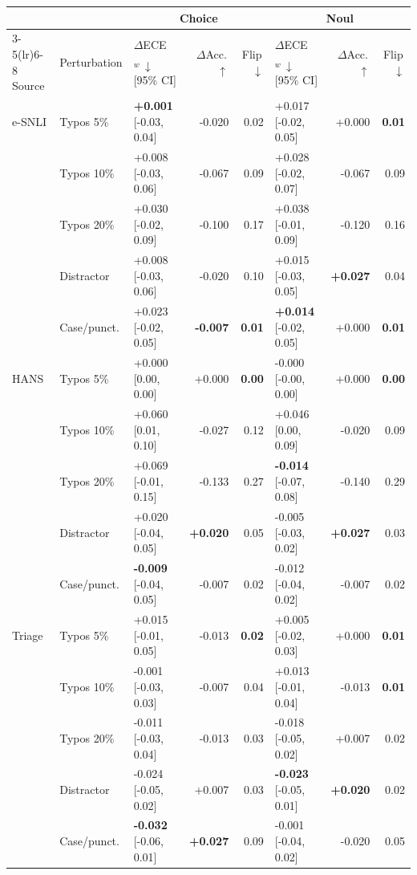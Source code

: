 \begin{tabular}{lllrrlrr}
\toprule
 & & \multicolumn{3}{c}{Choice} & \multicolumn{3}{c}{Noul} \\
\cmidrule(lr){3-5}\cmidrule(lr){6-8}
Source & Perturbation & $\Delta$ECE$_{w}\,\downarrow$ [95\% CI] & $\Delta$Acc.\,$\uparrow$ & Flip\,$\downarrow$ & $\Delta$ECE$_{w}\,\downarrow$ [95\% CI] & $\Delta$Acc.\,$\uparrow$ & Flip\,$\downarrow$ \\
\midrule
e-SNLI & Typos 5\% & \textbf{+0.001} [-0.03, 0.04] & -0.020 & 0.02 & +0.017 [-0.02, 0.05] & +0.000 & \textbf{0.01} \\
 & Typos 10\% & +0.008 [-0.03, 0.06] & -0.067 & 0.09 & +0.028 [-0.02, 0.07] & -0.067 & 0.09 \\
 & Typos 20\% & +0.030 [-0.02, 0.09] & -0.100 & 0.17 & +0.038 [-0.01, 0.09] & -0.120 & 0.16 \\
 & Distractor & +0.008 [-0.03, 0.06] & -0.020 & 0.10 & +0.015 [-0.03, 0.05] & \textbf{+0.027} & 0.04 \\
 & Case/punct. & +0.023 [-0.02, 0.05] & \textbf{-0.007} & \textbf{0.01} & \textbf{+0.014} [-0.02, 0.05] & +0.000 & \textbf{0.01} \\
\midrule
HANS & Typos 5\% & +0.000 [0.00, 0.00] & +0.000 & \textbf{0.00} & -0.000 [-0.00, 0.00] & +0.000 & \textbf{0.00} \\
 & Typos 10\% & +0.060 [0.01, 0.10] & -0.027 & 0.12 & +0.046 [0.00, 0.09] & -0.020 & 0.09 \\
 & Typos 20\% & +0.069 [-0.01, 0.15] & -0.133 & 0.27 & \textbf{-0.014} [-0.07, 0.08] & -0.140 & 0.29 \\
 & Distractor & +0.020 [-0.04, 0.05] & \textbf{+0.020} & 0.05 & -0.005 [-0.03, 0.02] & \textbf{+0.027} & 0.03 \\
 & Case/punct. & \textbf{-0.009} [-0.04, 0.05] & -0.007 & 0.02 & -0.012 [-0.04, 0.02] & -0.007 & 0.02 \\
\midrule
Triage & Typos 5\% & +0.015 [-0.01, 0.05] & -0.013 & \textbf{0.02} & +0.005 [-0.02, 0.03] & +0.000 & \textbf{0.01} \\
 & Typos 10\% & -0.001 [-0.03, 0.03] & -0.007 & 0.04 & +0.013 [-0.01, 0.04] & -0.013 & \textbf{0.01} \\
 & Typos 20\% & -0.011 [-0.03, 0.04] & -0.013 & 0.03 & -0.018 [-0.05, 0.02] & +0.007 & 0.02 \\
 & Distractor & -0.024 [-0.05, 0.02] & +0.007 & 0.03 & \textbf{-0.023} [-0.05, 0.01] & \textbf{+0.020} & 0.02 \\
 & Case/punct. & \textbf{-0.032} [-0.06, 0.01] & \textbf{+0.027} & 0.09 & -0.001 [-0.04, 0.02] & -0.020 & 0.05 \\
\bottomrule
\end{tabular}
